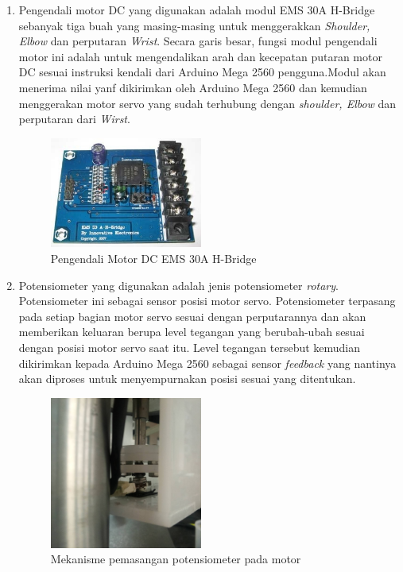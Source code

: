 	\begin{enumerate}
\item Pengendali motor DC yang digunakan adalah modul EMS 30A H-Bridge sebanyak tiga buah yang masing-masing untuk menggerakkan \textit{Shoulder, Elbow} dan perputaran \textit{Wrist}. Secara garis besar, fungsi modul pengendali motor ini adalah untuk mengendalikan arah dan kecepatan putaran motor DC sesuai instruksi kendali dari Arduino Mega 2560 pengguna.Modul akan menerima nilai yanf dikirimkan oleh Arduino Mega 2560 dan kemudian menggerakan motor servo yang sudah terhubung dengan \textit{shoulder, Elbow} dan perputaran dari \textit{Wirst}.

\begin{figure}[H]
	\centering
	\includegraphics[width=5cm	]{driver_motor.jpg}
	\caption{Pengendali Motor DC EMS 30A H-Bridge}
\end{figure}

\item Potensiometer yang digunakan adalah jenis potensiometer \textit{rotary}. Potensiometer ini sebagai sensor posisi motor servo. Potensiometer terpasang pada setiap bagian motor servo sesuai dengan perputarannya dan akan memberikan keluaran berupa level tegangan yang berubah-ubah sesuai dengan posisi motor servo saat itu. Level tegangan tersebut kemudian dikirimkan kepada Arduino Mega 2560 sebagai sensor \textit{feedback} yang nantinya akan diproses untuk menyempurnakan posisi sesuai yang ditentukan.
\begin{figure}[H]
	\centering
	\includegraphics[width=5cm	]{potensio.jpg}
	\caption{Mekanisme pemasangan potensiometer pada motor}
\end{figure}


\end{enumerate}
